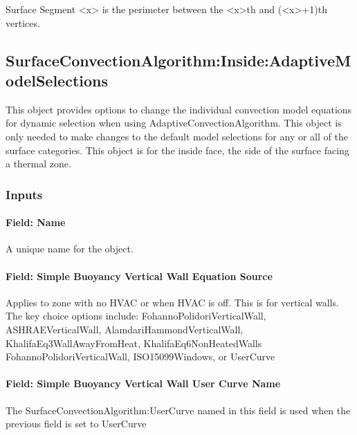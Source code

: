 Surface Segment \textless{}x\textgreater{} is the perimeter between the
\textless{}x\textgreater{}th and (\textless{}x\textgreater{}+1)th
vertices.

\subsection{SurfaceConvectionAlgorithm:Inside:AdaptiveModelSelections}\label{surfaceconvectionalgorithminsideadaptivemodelselections}

This object provides options to change the individual convection model equations for dynamic selection when using AdaptiveConvectionAlgorithm. This object is only needed to make changes to the default model selections for any or all of the surface categories. This object is for the inside face, the side of the surface facing a thermal zone.

\subsubsection{Inputs}\label{inputs-6}

\paragraph{Field: Name}\label{field-name-5}

A unique name for the object.

\paragraph{Field: Simple Buoyancy Vertical Wall Equation Source}\label{field-simple-buoyancy-vertical-wall-equation-source}

Applies to zone with no HVAC or when HVAC is off. This is for vertical walls. The key choice options include: FohannoPolidoriVerticalWall, ASHRAEVerticalWall, AlamdariHammondVerticalWall, KhalifaEq3WallAwayFromHeat, KhalifaEq6NonHeatedWalls FohannoPolidoriVerticalWall, ISO15099Windows, or UserCurve

\paragraph{Field: Simple Buoyancy Vertical Wall User Curve Name}\label{field-simple-buoyancy-vertical-wall-user-curve-name}

The SurfaceConvectionAlgorithm:UserCurve named in this field is used when the previous field is set to UserCurve

